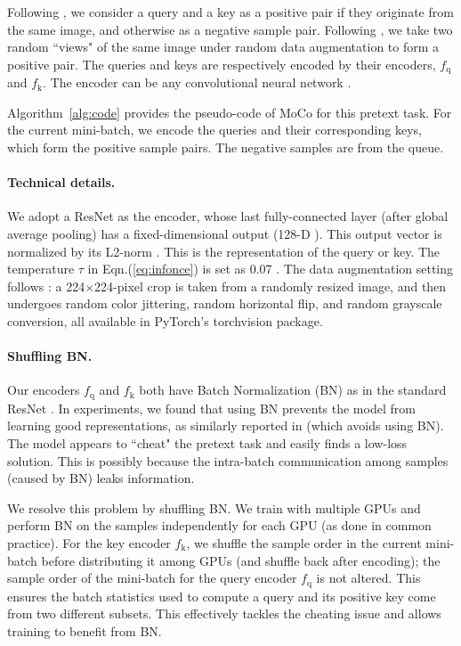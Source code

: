 \documentclass[10pt,twocolumn,letterpaper]{article}
\begin{document}
Following \cite{Wu2018a}, we consider a query and a key as a positive pair if they originate from the same image, and otherwise as a negative sample pair. Following \cite{Ye2019,Bachman2019}, we take two random ``views" of the same image under random data augmentation to form a positive pair.
The queries and keys are respectively encoded by their encoders, $f_\textrm{q}$ and $f_\textrm{k}$.
The encoder can be any convolutional neural network \cite{LeCun1989}.

Algorithm~\ref{alg:code} provides the pseudo-code of MoCo for this pretext task. For the current mini-batch, we encode the queries and their corresponding keys, which form the positive sample pairs. The negative samples are from the queue.

\paragraph{Technical details.}
We adopt a ResNet \cite{He2016} as the encoder, whose last fully-connected layer (after global average pooling) has a fixed-dimensional output (128-D \cite{Wu2018a}). This output vector is normalized by its L2-norm \cite{Wu2018a}. This is the representation of the query or key. The temperature $\tau$ in Eqn.(\ref{eq:infonce}) is set as 0.07 \cite{Wu2018a}.
The data augmentation setting follows \cite{Wu2018a}: a 224$\times$224-pixel crop is taken from a randomly resized image, and then undergoes random color jittering, random horizontal flip, and random grayscale conversion, all available in PyTorch's torchvision package.

\paragraph{Shuffling BN.} Our encoders $f_\textrm{q}$ and $f_\textrm{k}$ both have Batch Normalization (BN) \cite{Ioffe2015} as in the standard ResNet \cite{He2016}. In experiments, we found that using BN prevents the model from learning good representations, as similarly reported in \cite{Henaff2019} (which avoids using BN). 
The model appears to ``cheat" the pretext task and easily finds a low-loss solution. This is possibly because the intra-batch communication among samples (caused by BN) leaks information.

We resolve this problem by shuffling BN. We train with multiple GPUs and perform BN on the samples independently for each GPU (as done in common practice). 
For the key encoder $f_\textrm{k}$, we shuffle the sample order in the current mini-batch before distributing it among GPUs (and shuffle back after encoding); the sample order of the mini-batch for the query encoder $f_\textrm{q}$ is not altered. This ensures the batch statistics used to compute a query and its positive key come from two different subsets. This effectively tackles the cheating issue and allows training to benefit from BN.
\end{document}
